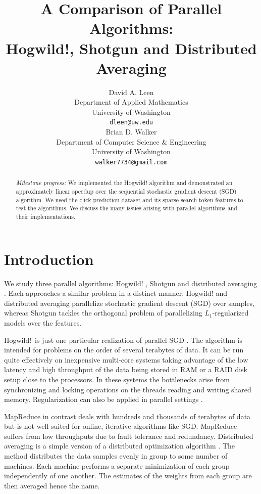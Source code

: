 \documentclass{article} %
\title{A Comparison of Parallel Algorithms:\\ {\Large Hogwild!, Shotgun and Distributed Averaging}}
\author{
David A. Leen \\
Department of Applied Mathematics\\
University of Washington \\
\texttt{dleen@uw.edu} \\
\And
Brian D. Walker \\
Department of Computer Science \& Engineering \\
University of Washington \\
\texttt{walker7734@gmail.com} \\
}
\begin{document}
\maketitle

\begin{abstract}
{\em Milestone progress:} We implemented the Hogwild! algorithm and demonstrated an approximately linear speedup over the
sequential stochastic gradient descent (SGD) algorithm.  We used the click prediction dataset and its sparse search token features to test the algorithms. We discuss the many issues arising with parallel algorithms and their implementations.
\end{abstract}

\section{Introduction}
We study three parallel algorithms: Hogwild! \cite{niu2011hogwild}, Shotgun \cite{bradley2011parallel} and distributed averaging \cite{zhang2012comunication}. Each approaches a similar problem in a distinct manner. Hogwild! and distributed averaging parallelize stochastic gradient descent (SGD) over samples, whereas Shotgun tackles the orthogonal problem of parallelizing $L_1$-regularized models over the features.

Hogwild!~is just one particular realization of parallel SGD \cite{niu2011hogwild, zinkevich2010parallelized}. The algorithm is intended for problems on the order of several terabytes of data. It can be run quite effectively on inexpensive multi-core systems taking advantage of the low latency and high throughput of the data being stored in RAM or a RAID disk setup close to the processors. In these systems the bottlenecks arise from synchronizing and locking operations on the threads reading and writing shared memory. Regularization can also be applied in parallel settings \cite{langford2009slow, agarwal2011distributed}.

MapReduce in contrast deals with hundreds and thousands of terabytes of data but is not well suited for online, iterative algorithms like SGD. MapReduce suffers from low throughputs due to fault tolerance and redundancy. Distributed averaging is a simple version of a distributed optimization algorithm \cite{dekel2012optimal, agarwal2011distributed}. The method distributes the data samples evenly in group to some number of machines. Each machine performs a separate minimization of each group independently of one another. The estimates of the weights from each group are then averaged hence the name.
\end{document}
